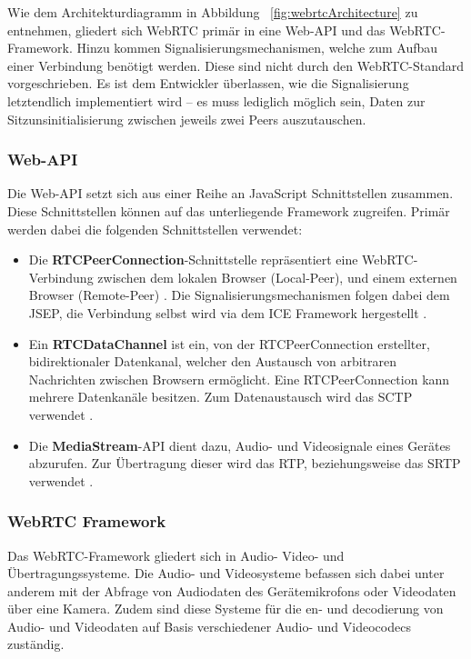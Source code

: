 Wie dem Architekturdiagramm in Abbildung ~\ref{fig:webrtcArchitecture} zu entnehmen, gliedert sich WebRTC primär in eine Web-\acs{API} und das \acs{WebRTC}-Framework. Hinzu kommen Signalisierungsmechanismen, welche zum Aufbau einer Verbindung benötigt werden. Diese sind nicht durch den WebRTC-Standard vorgeschrieben. Es ist dem Entwickler überlassen, wie die Signalisierung letztendlich implementiert wird -- es muss lediglich möglich sein, Daten zur Sitzunsinitialisierung zwischen jeweils zwei Peers auszutauschen.\par

\subsubsection*{Web-API}
Die Web-\acs{API} setzt sich aus einer Reihe an JavaScript Schnittstellen zusammen. Diese Schnittstellen können auf das unterliegende Framework zugreifen. Primär werden dabei die folgenden Schnittstellen verwendet:

\begin{itemize}
  \item Die \textbf{RTCPeerConnection}-Schnittstelle repräsentiert eine WebRTC-Verbindung zwischen dem lokalen Browser (Local-Peer), und einem externen Browser (Remote-Peer) \cite{rtcpeerconnection}. Die Signalisierungsmechanismen folgen dabei dem \ac{JSEP}, die Verbindung selbst wird via dem \ac{ICE} Framework hergestellt \cite{loreto2014}.
  
  \item Ein \textbf{RTCDataChannel} ist ein, von der RTCPeerConnection erstellter, bidirektionaler Datenkanal, welcher den Austausch von arbitraren Nachrichten zwischen Browsern ermöglicht. Eine RTCPeerConnection kann mehrere Datenkanäle besitzen. Zum Datenaustausch wird das \ac{SCTP} verwendet \cite{loreto2014, rtcpeerconnection}.
  
  \item Die \textbf{MediaStream}-\acs{API} dient dazu, Audio- und Videosignale eines Gerätes abzurufen. Zur Übertragung dieser wird das \ac{RTP}, beziehungsweise das \ac{SRTP} verwendet \cite{loreto2014}.
\end{itemize}

\subsubsection*{WebRTC Framework}
Das \acs{WebRTC}-Framework gliedert sich in Audio- Video- und Übertragungssysteme. Die Audio- und Videosysteme befassen sich dabei unter anderem mit der Abfrage von Audiodaten des Gerätemikrofons oder Videodaten über eine Kamera. Zudem sind diese Systeme für die en- und decodierung von Audio- und Videodaten auf Basis verschiedener Audio- und Videocodecs zuständig.\par

